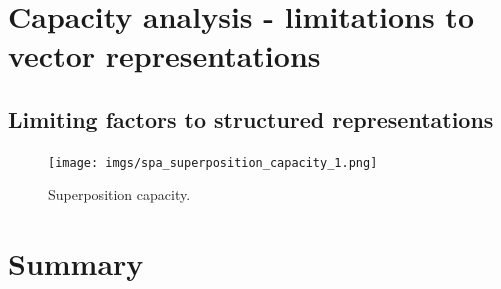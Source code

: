 \section{Capacity analysis - limitations to vector representations}%
\label{sec:capacity_analysis_limitations_to_vector_representations}

\subsection{Limiting factors to structured representations}%
\label{subsec:limiting_factors_to_structured_representations}


\begin{figure}[t]
	\centering
	\texttt{[image: imgs/spa\_superposition\_capacity\_1.png]}
	\caption{Superposition capacity.}
	\label{fig:spa_superposition_capacity}
\end{figure}

\section{Summary}%
\label{sec:vector_representations_automotive_summary}


